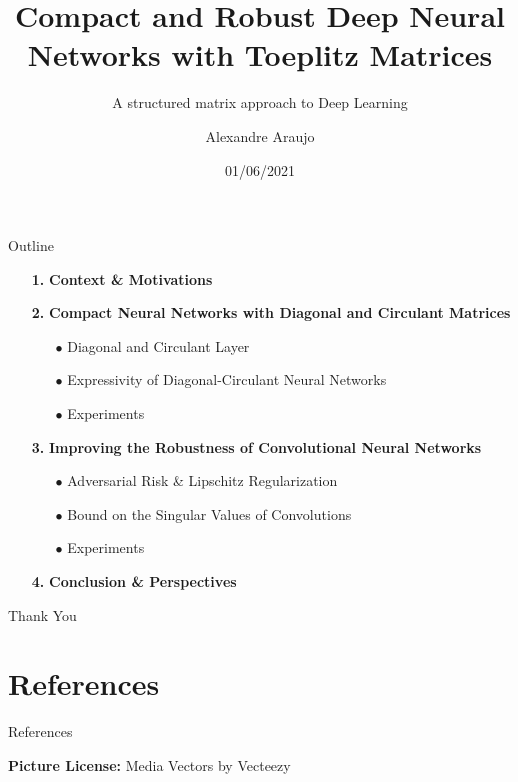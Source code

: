 \documentclass[usenames,dvipsnames,9pt]{beamer}
\title{\normalsize{Compact and Robust Deep Neural Networks with Toeplitz Matrices}}
\subtitle{\normalsize{A structured matrix approach to Deep Learning}}
\date{01/06/2021}
\author{Alexandre Araujo}
\institute{Universit\'e Paris-Dauphine-PSL}
\begin{document}
  \maketitle

  \begin{frame}{Outline}
    \begin{itemize}
      \item[\textbf{1.}] \textbf{Context \& Motivations}
      \item[\textbf{2.}] \textbf{Compact Neural Networks with Diagonal and Circulant Matrices}
      \begin{itemize}
        \item[$\bullet$] Diagonal and Circulant Layer
        \item[$\bullet$] Expressivity of Diagonal-Circulant Neural Networks
        \item[$\bullet$] Experiments
      \end{itemize}
      \item[\textbf{3.}] \textbf{Improving the Robustness of Convolutional Neural Networks}
      \begin{itemize}
        \item[$\bullet$] Adversarial Risk \& Lipschitz Regularization
        \item[$\bullet$] Bound on the Singular Values of Convolutions 
        \item[$\bullet$] Experiments
      \end{itemize}
      \item[\textbf{4.}] \textbf{Conclusion \& Perspectives}
    \end{itemize}
  \end{frame}


  
  
  
  

  \begin{frame}
    \centering
    \Huge Thank You
  \end{frame}

  

  \section{References}
  \begin{frame}{References}
    
    
    \vspace{0.8cm}
    \textbf{Picture License:} Media Vectors by Vecteezy
  \end{frame}
\end{document}
